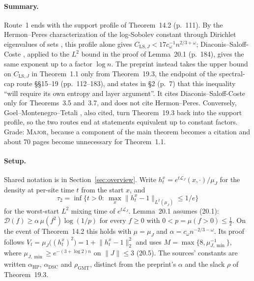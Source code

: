 \documentclass[11pt]{article}
\newcommand{\D}{\mathcal{D}}
\newcommand{\Lgen}{\mathcal{L}}
\newcommand{\norm}[1]{\lVert #1\rVert}
\newcommand{\ploc}[2]{#1}
\newcommand{\sloc}[2]{\cite[#2]{#1}}
\newcommand{\grade}[1]{\textsc{#1}}
\begin{document}
\paragraph{Summary.}
Route~1 ends with the support profile of
\ploc{Theorem~14.2}{profile-entropy.tex:599--612} (p.~111). By the
Hermon--Peres characterization of the log-Sobolev constant through Dirichlet
eigenvalues of sets
\sloc{HermonPeres2016-L2MixingHypercontractivityHitting}{Thm~1.2, p.~3 of
arXiv v3}, this profile alone gives
$C_{\mathrm{LS},J}<17c_\omega^{-1}n^{2/3+\omega}$; Diaconis--Saloff-Coste
\sloc{DiaconisSaloffCoste1996-LogSobolevFiniteMarkovChains}{Cor.~3.11,
p.~728}, applied to the $L^2$ bound in the proof of
\ploc{Lemma~20.1}{dynamics.tex:83--93} (p.~184), gives the same exponent up to a
factor $\log n$. The preprint instead takes the upper bound on
$C_{\mathrm{LS},J}$ in Theorem~1.1 only from
\ploc{Theorem~19.3}{cap-entropy.tex:856--874}, the endpoint of the
spectral-cap route \ploc{\S\S15--19 (pp.~112--183)}{cap-static.tex:1 to
cap-entropy.tex:874}, and states in \ploc{\S2 (p.~7)}{model.tex:70--72} that
this inequality ``will require its own entropy and layer argument''. It cites
Diaconis--Saloff-Coste only for Theorems~3.5 and~3.7, and does not cite
Hermon--Peres. Conversely, Goel--Montenegro--Tetali
\sloc{GoelEtAl2005-MixingSpectralProfile}{Lemma~4.2 and the remark after it,
p.~15 of arXiv v1}, also cited, turn Theorem~19.3 back into the support
profile, so the two routes end at statements equivalent up to constant
factors. Grade:
\grade{Major}, because a component of the main theorem becomes a citation and
about 70 pages become unnecessary for Theorem~1.1.

\paragraph{Setup.}
Shared notation is in Section~\ref{sec:overview}. Write
$h_t^x=e^{t\Lgen_J}(x,\cdot)/\mu_J$ for the density at per-site time $t$ from
the start $x$, and
\[
 \tau_2=\inf\bigl\{t>0:\ \max_x\norm{h_t^x-1}_{L^2(\mu_J)}\le1/e\bigr\}
\]
for the worst-start $L^2$ mixing time of $e^{t\Lgen_J}$. Lemma~20.1 assumes
\ploc{(20.1)}{dynamics.tex:17--22}: $\D(f)\ge\alpha\,\mu(f^2)\log(1/p)$ for
every $f\ge0$ with $0<p=\mu(f>0)\le\frac12$. On the event of Theorem~14.2 this
holds with $\mu=\mu_J$ and $\alpha=c_\omega n^{-2/3-\omega}$. Its proof
follows $V_t=\mu_J\bigl((h_t^x)^2\bigr)=1+\norm{h_t^x-1}_2^2$ and uses
$M=\max\{8,\mu_{J,\min}^{-1}\}$, where $\mu_{J,\min}\ge e^{-(3+\log2)n}$ on
$\norm J\le3$ \ploc{(20.5)}{dynamics.tex:144--146}. The sources'
constants are written $\alpha_{\mathrm{HP}}$, $\alpha_{\mathrm{DSC}}$ and
$\rho_{\mathrm{GMT}}$, distinct from the preprint's $\alpha$ and the slack
$\rho$ of Theorem~19.3.
\end{document}
